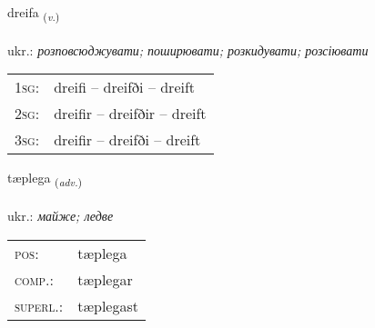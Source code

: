 \documentclass[frontgrid, backgrid]{flacards}\usepackage[]{graphicx}\usepackage[]{xcolor}
\begin{document}
\renewcommand{\flhead}{\vskip5pt \fboxsep=0pt {\small\bfseries\footnotesize Sagnorð | дієслово}}
\renewcommand{\fcfoot}{\vskip5pt \fboxsep=0pt \hspace{2pt}{\small\bfseries\footnotesize 2K}}

\renewcommand{\blhead}{\vskip5pt {\small\bfseries\footnotesize Sagnorð | дієслово }}
\renewcommand{\bcfoot}{\vskip5pt \hspace{2pt}{\small\bfseries\footnotesize 2K}}


{dreifa \small{\textsubscript{(\textit{v.})}} \\[1ex] %
\textphonetic{[treiːva]} \\
ukr.: \emph{розповсюджувати; поширювати; розкидувати; розсіювати} \\  [2ex]
\renewcommand*{\arraystretch}{0.8}
\begin{tabular}{p{1cm}l}
\textsc{1sg}: & dreifi -- dreifði -- dreift \\ 
\textsc{2sg}: & dreifir -- dreifðir -- dreift \\ 
\textsc{3sg}: & dreifir -- dreifði -- dreift \\ 
\end{tabular}
}

\renewcommand{\flhead}{\vskip5pt \fboxsep=0pt {\small\bfseries\footnotesize Atviksorð | прислівник}}
\renewcommand{\fcfoot}{\vskip5pt \fboxsep=0pt \hspace{2pt}{\small\bfseries\footnotesize 2K}}

\renewcommand{\blhead}{\vskip5pt {\small\bfseries\footnotesize Atviksorð | прислівник }}
\renewcommand{\bcfoot}{\vskip5pt \hspace{2pt}{\small\bfseries\footnotesize 2K}}


{tæplega \small{\textsubscript{(\textit{adv.})}} \\[1ex] %
\textphonetic{[tʰaiplɛɣa]} \\
ukr.: \emph{майже; ледве} \\  [2ex]
\renewcommand*{\arraystretch}{0.8}
\begin{tabular}{ll}
\textsc{pos}: & tæplega \\ 
\textsc{comp.}: & tæplegar \\ 
\textsc{superl.}: & tæplegast \\
\end{tabular}
}
\end{document}
